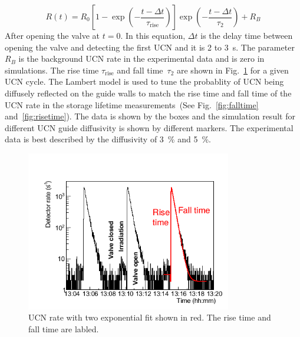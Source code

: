 \begin{equation}
R(t) = R_0 \left[ 1 - \exp \left( -\frac{t - \Delta t}{\tau_\mathrm{rise}} \right) \right] \exp \left( -\frac{t - \Delta t}{\tau_2} \right) + R_B
\end{equation}
After opening the valve at $t=0$. In this equation, $\Delta t$ is the
delay time between opening the valve and detecting the first UCN and
it is 2 to 3~s. The parameter $ R_B$ is the background UCN rate in the
experimental data and is zero in simulations.  The rise time
$\tau_{\mathrm{rise}}$ and fall time~$\tau_2$ are shown in
Fig.~\ref{fig:risefalltime} for a given UCN cycle.  The Lambert model
is used to tune the probablity of UCN being diffusely reflected on the
guide walls to match the rise time and fall
time of the UCN rate in the storage lifetime
measurements~(See Fig.~\ref{fig:falltime} and~\ref{fig:risetime}). The
data is shown by the boxes and the simulation result for different UCN
guide diffusivity is shown by different markers. The experimental data
is best described by the diffusivity of 3~\% and 5~\%.


\begin{figure}[h!]
  \centering
  \includegraphics[width=0.8\textwidth]{risefalltime.png}
  \caption{UCN rate with two exponential fit shown in red. The rise
    time and fall time are labled.}
  \label{fig:risefalltime}
\end{figure}



